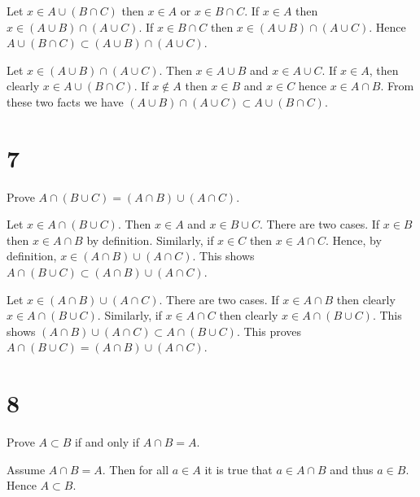 \documentclass[a4paper]{article}
\begin{document}
Let $x \in A \cup (B \cap C)$ then $x \in A$ or $x \in B \cap C$. If $x \in A$ then $x \in (A \cup B) \cap (A \cup C)$. If $x \in B \cap C$ then $x \in (A \cup B) \cap (A \cup C)$. Hence $A \cup (B \cap C) \subset (A \cup B) \cap (A \cup C)$. 

\vspace{\baselineskip}

Let $x \in (A \cup B) \cap (A \cup C)$. Then $x \in A \cup B$ and $x \in A \cup C$. If $x \in A$, then clearly $x \in A \cup (B \cap C)$. If $x \not\in A$ then $x \in B$ and $x \in C$ hence $x \in A \cap B$. From these two facts we have  $(A \cup B) \cap (A \cup C) \subset A \cup (B \cap C)$.


\section*{7}

Prove $A \cap (B \cup C) = (A \cap B) \cup (A \cap C)$.

\vspace{\baselineskip}

Let $x \in A \cap (B \cup C)$. Then $x\in A$ and $x \in B \cup C$. There are two cases. If $x \in B$ then $x \in A \cap B$ by definition. Similarly, if $x \in C$ then $x \in A \cap C$. Hence, by definition, $x \in (A \cap B) \cup (A \cap C)$. This shows $A \cap (B \cup C) \subset (A \cap B) \cup (A \cap C)$.

\vspace{\baselineskip}

Let $x \in (A \cap B) \cup (A \cap C)$. There are two cases. If $x \in A \cap B$ then clearly $x \in A \cap (B \cup C)$. Similarly, if $x \in A \cap C$ then clearly $x \in A \cap (B \cup C)$. This shows $(A \cap B) \cup (A \cap C) \subset A \cap (B \cup C)$. This proves $A \cap (B \cup C) = (A \cap B) \cup (A \cap C)$.


\section*{8}

Prove $A \subset B$ if and only if $A \cap B = A$.

\vspace{\baselineskip}

Assume $A \cap B = A$. Then  for all $a \in A$ it is true that $a \in A \cap B$ and thus $a \in B$. Hence $A \subset B$.

\vspace{\baselineskip}
\end{document}
